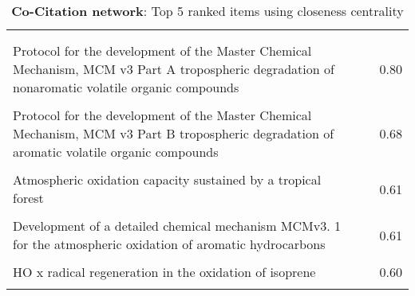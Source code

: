 \begin{table}[H]
     \begin{tabular}{p{}p{}c}
     \toprule
      & & \\\\
     Protocol for the development of the Master Chemical Mechanism, MCM v3 Part A tropospheric degradation of nonaromatic volatile organic compounds & \cite{closeness0} & 0.80  \\ \\
        Protocol for the development of the Master Chemical Mechanism, MCM v3 Part B tropospheric degradation of aromatic volatile organic compounds & \cite{closeness1} & 0.68  \\ \\
        Atmospheric oxidation capacity sustained by a tropical forest & \cite{closeness2} & 0.61  \\ \\
        Development of a detailed chemical mechanism MCMv3. 1 for the atmospheric oxidation of aromatic hydrocarbons & \cite{closeness3} & 0.61  \\ \\
        HO x radical regeneration in the oxidation of isoprene & \cite{closeness4} & 0.60  \\ \\
        \bottomrule
    \end{tabular}
    \label{tab:closeness_Co-Citation}
    \caption{\textbf{Co-Citation network}: Top 5 ranked items using closeness centrality}
    \end{table}

    